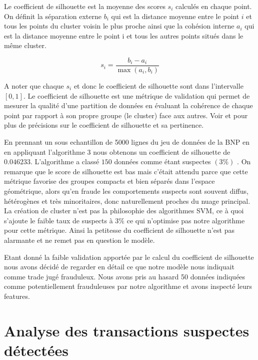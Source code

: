 \documentclass[a4paper]{article}
\begin{document}
Le coefficient de silhouette est la moyenne des scores $s_i$ calculés en chaque point. On définit la séparation externe $b_i$ qui est la distance moyenne entre le point $i$ et tous les points du cluster voisin le plus proche ainsi que la cohésion interne $a_i$ qui est la distance moyenne entre le point i et tous les autres points situés dans le même cluster. 

$$s_i = \frac{b_i - a_i}{\max(a_i, b_i)}$$

A noter que chaque $s_i$ et donc le coefficient de silhouette sont dans l'intervalle $[0, 1]$. Le coefficient de silhouette est une métrique de validation qui permet de mesurer la qualité d’une partition de données en évaluant la cohérence de chaque point par rapport à son propre groupe (le cluster) face aux autres. Voir \cite{Rousseeuw1987} et \cite{Shahapure2020} pour plus de précisions sur le coefficient de silhouette et sa pertinence. 

En prennant un sous echantillon de 5000 lignes du jeu de données de la BNP en en appliquant l'algorithme 3 nous obtenons un coefficient de silhouette de $0.046233$. L'algorithme a classé $150$ données comme étant suspectes $(3\%)$ . On remarque que le score de silhouette est bas mais c'était attendu parce que cette métrique favorise des groupes compacts et bien séparés dans l’espace géométrique, alors qu’en fraude les comportements suspects sont souvent diffus, hétérogènes et très minoritaires, donc naturellement proches du nuage principal. La création de cluster n'est pas la philosophie des algorithmes SVM, ce à quoi s'ajoute le faible taux de suspects à $3\%$ ce qui n'optimise pas notre algorithme pour cette métrique. Ainsi la petitesse du coefficient de silhouette n'est pas alarmante et ne remet pas en question le modèle.  


Etant donné la faible validation apportée par le calcul du coefficient de silhouette nous avons décidé de regarder en détail ce que notre modèle nous indiquait comme trade jugé frauduleux. Nous avons pris au hasard 50 données indiquées comme potentiellement frauduleuses par notre algorithme et avons inspecté leurs features. 

\section{Analyse des transactions suspectes détectées}
\end{document}
